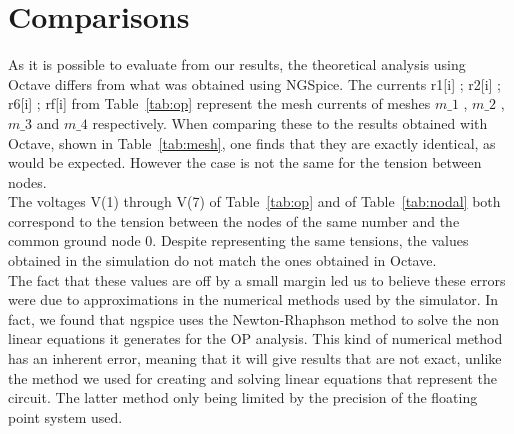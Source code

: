 \section{Comparisons}
\label{sec:comparisons}

As it is possible to evaluate from our results, the theoretical analysis using Octave differs from what was obtained using NGSpice. The currents r1[i] ; r2[i] ; r6[i] ; rf[i] from Table~\ref{tab:op} represent the mesh currents of meshes $m\_1$ , $m\_2$ , $m\_3$ and $m\_4$ respectively. When comparing these to the results obtained with Octave, shown in Table~\ref{tab:mesh}, one finds that they are exactly identical, as would be expected. However the case is not the same for the tension between nodes.\\
The voltages V(1) through V(7) of Table~\ref{tab:op} and of Table~\ref{tab:nodal} both correspond to the tension between the nodes of the same number and the common ground node 0. Despite representing the same tensions, the values obtained in the simulation do not match the ones obtained in Octave.\\
The fact that these values are off by a small margin led us to believe these errors were due to approximations in the numerical methods used by the simulator. In fact, we found that ngspice uses the Newton-Rhaphson method to solve the non linear equations it generates for the OP analysis. This kind of numerical method has an inherent error, meaning that it will give results that are not exact, unlike the method we used for creating and solving linear equations that represent the circuit. The latter method only being limited by the precision of the floating point system used.
